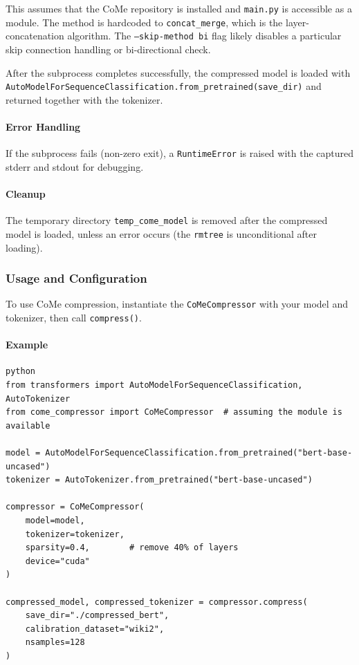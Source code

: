 This assumes that the CoMe repository is installed and \texttt{main.py} is accessible as a module. The method is hardcoded to \texttt{concat\_merge}, which is the layer-concatenation algorithm. The \texttt{--skip-method bi} flag likely disables a particular skip connection handling or bi-directional check.

After the subprocess completes successfully, the compressed model is loaded with \texttt{AutoModelForSequenceClassification.from\_pretrained(save\_dir)} and returned together with the tokenizer.

\paragraph{Error Handling}

If the subprocess fails (non-zero exit), a \texttt{RuntimeError} is raised with the captured stderr and stdout for debugging.

\paragraph{Cleanup}

The temporary directory \texttt{temp\_come\_model} is removed after the compressed model is loaded, unless an error occurs (the \texttt{rmtree} is unconditional after loading).


\subsubsection*{Usage and Configuration}

To use CoMe compression, instantiate the \texttt{CoMeCompressor} with your model and tokenizer, then call \texttt{compress()}.

\paragraph{Example}

\vspace{0.5em}
\begin{mdframed}[backgroundcolor=codebg, linecolor=codeframe, linewidth=1pt, roundcorner=4pt, innerleftmargin=2pt, innerrightmargin=5pt, innertopmargin=5pt, innerbottommargin=5pt]
\begin{lstlisting}
python
from transformers import AutoModelForSequenceClassification, AutoTokenizer
from come_compressor import CoMeCompressor  # assuming the module is available

model = AutoModelForSequenceClassification.from_pretrained("bert-base-uncased")
tokenizer = AutoTokenizer.from_pretrained("bert-base-uncased")

compressor = CoMeCompressor(
    model=model,
    tokenizer=tokenizer,
    sparsity=0.4,        # remove 40% of layers
    device="cuda"
)

compressed_model, compressed_tokenizer = compressor.compress(
    save_dir="./compressed_bert",
    calibration_dataset="wiki2",
    nsamples=128
)
\end{lstlisting}
\end{mdframed}
\vspace{0.5em}

